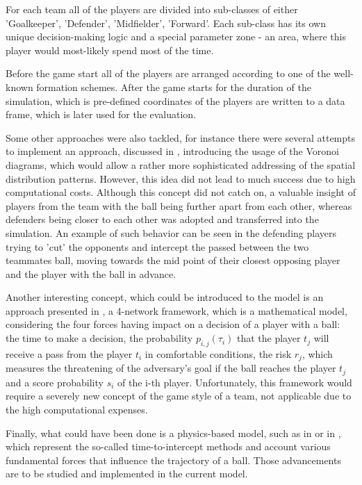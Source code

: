 For each team all of the players are divided into sub-classes of either {'Goalkeeper', 'Defender', 'Midfielder', 'Forward'}. Each sub-class has its own unique decision-making logic and a special parameter zone - an area, where this player would most-likely spend most of the time. 

Before the game start all of the players are arranged according to one of the well-known formation schemes. After the game starts for the duration of the simulation, which is pre-defined coordinates of the players are written to a data frame, which is later used for the evaluation. 

Some other approaches were also tackled, for instance there were several attempts to implement an approach, discussed in \cite{FONSECA20121652}, introducing the usage of the Voronoi diagrams, which would allow a rather more sophisticated addressing of the spatial distribution patterns. However, this idea did not lead to much success due to high computational costs. Although this concept did not catch on, a valuable insight of players from the team with the ball being further apart from each other, whereas defenders being closer to each other was adopted and transferred into the simulation. An example of such behavior can be seen in the defending players trying to 'cut' the opponents and intercept the passed between the two teammates ball, moving towards the mid point of their closest opposing player and the player with the ball in advance.

Another interesting concept, which could be introduced to the model is an approach presented in \cite{boudine2024new}, a 4-network framework, which is a mathematical model, considering the four forces having impact on a decision of a player with a ball: the time to make a decision, the probability $p_{i, j}(\tau_i)$ that the player $t_j$ will receive a pass from the player $t_i$ in comfortable conditions, the risk $r_j$, which measures  the threatening of the adversary’s goal if the ball reaches the player $t_j$ and a score probability $s_i$ of the i-th player. Unfortunately, this framework would require a severely new concept of the game style of a team, not applicable due to the high computational expenses.

Finally, what could have been done is a physics-based model, such as in \cite{Spearman} or in \cite{Alguacil2019ModellingTC}, which represent the so-called time-to-intercept methods and account various fundamental forces that influence the trajectory of a ball. Those advancements are to be studied and implemented in the current model.

